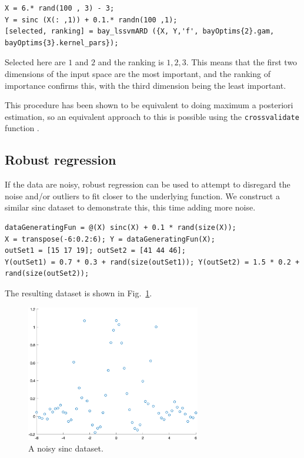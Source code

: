 \documentclass[10pt,a4paper]{article}
\begin{document}
\begin{lstlisting}[style=Matlab-editor]
X = 6.* rand(100 , 3) - 3;
Y = sinc (X(: ,1)) + 0.1.* randn(100 ,1);
[selected, ranking] = bay_lssvmARD ({X, Y,'f', bayOptims{2}.gam, bayOptims{3}.kernel_pars});
\end{lstlisting}

Selected here are $1$ and $2$ and the ranking is $1, 2, 3$. This means that the first two dimensions of the input space are the most important, and the ranking of importance confirms this, with the third dimension being the least important.

This procedure has been shown to be equivalent to doing maximum a posteriori estimation, so an equivalent approach to this is possible using the \texttt{crossvalidate} function \cite{wipfNewViewAutomatic}.

\subsection{Robust regression}
If the data are noisy, robust regression can be used to attempt to disregard the noise and/or outliers to fit closer to the underlying function. We construct a similar sinc dataset to demonstrate this, this time adding more noise.

\begin{lstlisting}[style=Matlab-editor]
dataGeneratingFun = @(X) sinc(X) + 0.1 * rand(size(X));
X = transpose(-6:0.2:6); Y = dataGeneratingFun(X);
outSet1 = [15 17 19]; outSet2 = [41 44 46];
Y(outSet1) = 0.7 * 0.3 + rand(size(outSet1)); Y(outSet2) = 1.5 * 0.2 + rand(size(outSet2)); 
\end{lstlisting}

The resulting dataset is shown in Fig.~\ref{fig:noisyData}.

\begin{figure}[h!]
  \includegraphics[width=3in]{noisyData.png}
  \caption{A noisy sinc dataset.}
  \label{fig:noisyData}
\end{figure}
\end{document}
